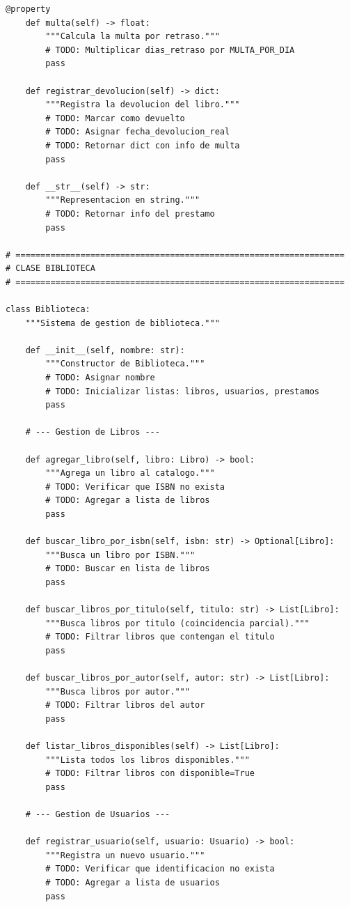 \documentclass[11pt,letterpaper]{article}
\begin{document}
\begin{lstlisting}[caption={Plantilla de clases principales}]
    @property
    def multa(self) -> float:
        """Calcula la multa por retraso."""
        # TODO: Multiplicar dias_retraso por MULTA_POR_DIA
        pass
    
    def registrar_devolucion(self) -> dict:
        """Registra la devolucion del libro."""
        # TODO: Marcar como devuelto
        # TODO: Asignar fecha_devolucion_real
        # TODO: Retornar dict con info de multa
        pass
    
    def __str__(self) -> str:
        """Representacion en string."""
        # TODO: Retornar info del prestamo
        pass

# ==================================================================
# CLASE BIBLIOTECA
# ==================================================================

class Biblioteca:
    """Sistema de gestion de biblioteca."""
    
    def __init__(self, nombre: str):
        """Constructor de Biblioteca."""
        # TODO: Asignar nombre
        # TODO: Inicializar listas: libros, usuarios, prestamos
        pass
    
    # --- Gestion de Libros ---
    
    def agregar_libro(self, libro: Libro) -> bool:
        """Agrega un libro al catalogo."""
        # TODO: Verificar que ISBN no exista
        # TODO: Agregar a lista de libros
        pass
    
    def buscar_libro_por_isbn(self, isbn: str) -> Optional[Libro]:
        """Busca un libro por ISBN."""
        # TODO: Buscar en lista de libros
        pass
    
    def buscar_libros_por_titulo(self, titulo: str) -> List[Libro]:
        """Busca libros por titulo (coincidencia parcial)."""
        # TODO: Filtrar libros que contengan el titulo
        pass
    
    def buscar_libros_por_autor(self, autor: str) -> List[Libro]:
        """Busca libros por autor."""
        # TODO: Filtrar libros del autor
        pass
    
    def listar_libros_disponibles(self) -> List[Libro]:
        """Lista todos los libros disponibles."""
        # TODO: Filtrar libros con disponible=True
        pass
    
    # --- Gestion de Usuarios ---
    
    def registrar_usuario(self, usuario: Usuario) -> bool:
        """Registra un nuevo usuario."""
        # TODO: Verificar que identificacion no exista
        # TODO: Agregar a lista de usuarios
        pass
    

\end{lstlisting}
\end{document}

